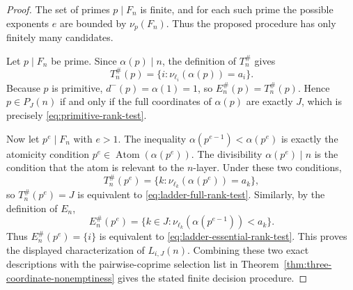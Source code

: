 \documentclass[11pt,letterpaper]{article}
\numberwithin{equation}{section}
\theoremstyle{plain}
\theoremstyle{definition}
\theoremstyle{remark}
\DeclareMathOperator{\Atom}{Atom}
\begin{document}
\begin{proof}
The set of primes \(p\mid F_n\) is finite, and for each such prime the possible
exponents \(e\) are bounded by \(\nu_p(F_n)\). Thus the proposed procedure has
only finitely many candidates.

Let \(p\mid F_n\) be prime. Since \(\alpha(p)\mid n\), the definition of
\(T_n^\#\) gives
\[
T_n^\#(p)=
\{i:\nu_{\ell_i}(\alpha(p))=a_i\}.
\]
Because \(p\) is primitive, \(d^-(p)=\alpha(1)=1\), so
\(E_n^\#(p)=T_n^\#(p)\). Hence \(p\in P_J(n)\) if and only if the full
coordinates of \(\alpha(p)\) are exactly \(J\), which is precisely
\eqref{eq:primitive-rank-test}.

Now let \(p^e\mid F_n\) with \(e>1\). The inequality
\(\alpha(p^{e-1})<\alpha(p^e)\) is exactly the atomicity condition
\(p^e\in\Atom(\alpha(p^e))\). The divisibility \(\alpha(p^e)\mid n\) is the
condition that the atom is relevant to the \(n\)-layer. Under these two
conditions,
\[
T_n^\#(p^e)=
\{k:\nu_{\ell_k}(\alpha(p^e))=a_k\},
\]
so \(T_n^\#(p^e)=J\) is equivalent to
\eqref{eq:ladder-full-rank-test}. Similarly, by the definition of \(E_n\),
\[
E_n^\#(p^e)=
\{k\in J:\nu_{\ell_k}(\alpha(p^{e-1}))<a_k\}.
\]
Thus \(E_n^\#(p^e)=\{i\}\) is equivalent to
\eqref{eq:ladder-essential-rank-test}. This proves the displayed
characterization of \(L_{i,J}(n)\). Combining these two exact descriptions
with the pairwise-coprime selection list in
Theorem~\ref{thm:three-coordinate-nonemptiness} gives the stated finite
decision procedure.
\end{proof}
\end{document}
